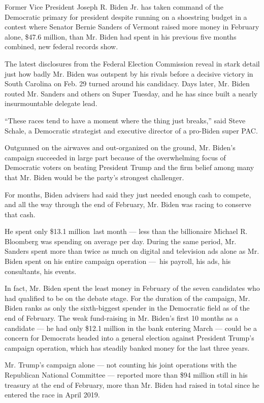Former Vice President Joseph R. Biden Jr. has taken command of the
Democratic primary for president despite running on a shoestring budget
in a contest where Senator Bernie Sanders of Vermont raised more money
in February alone, \$47.6 million, than Mr. Biden had spent in his
previous five months combined, new federal records show.

The latest disclosures from the Federal Election Commission reveal in
stark detail just how badly Mr. Biden was outspent by his rivals before
a decisive victory in South Carolina on Feb. 29 turned around his
candidacy. Days later, Mr. Biden routed Mr. Sanders and others on Super
Tuesday, and he has since built a nearly insurmountable delegate lead.

``These races tend to have a moment where the thing just breaks,'' said
Steve Schale, a Democratic strategist and executive director of a
pro-Biden super PAC.

Outgunned on the airwaves and out-organized on the ground, Mr. Biden's
campaign succeeded in large part because of the overwhelming focus of
Democratic voters on beating President Trump and the firm belief among
many that Mr. Biden would be the party's strongest challenger.

For months, Biden advisers had said they just needed enough cash to
compete, and all the way through the end of February, Mr. Biden was
racing to conserve that cash.

He spent only \$13.1 million~last month --- less than the billionaire
Michael R. Bloomberg was spending on average per day. During the same
period, Mr. Sanders spent more than twice as much on digital and
television ads alone as Mr. Biden spent on his entire campaign operation
---~his payroll, his ads, his consultants, his events.

In fact, Mr. Biden spent the least money in February of the seven
candidates who had qualified to be on the debate stage. For the duration
of the campaign, Mr. Biden ranks as only the sixth-biggest spender in
the Democratic field as of the end of February. The weak fund-raising in
Mr. Biden's first 10 months as a candidate --- he had only \$12.1
million in the bank entering March --- could be a concern for Democrats
headed into a general election against President Trump's campaign
operation, which has steadily banked money for the last three years.

Mr. Trump's campaign alone --- not counting his joint operations with
the Republican National Committee --- reported more than \$94 million
still in his treasury at the end of February, more than Mr. Biden had
raised in total since he entered the race in April 2019.

